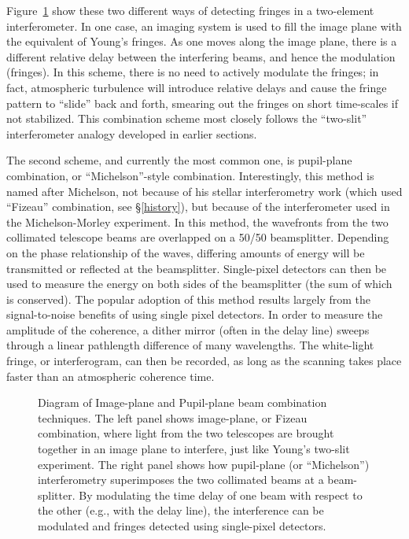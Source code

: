 \documentclass[12pt]{article}
\begin{document}
Figure~\ref{monnier_combiner} show these two different ways of
detecting fringes in a two-element interferometer.  In one case, an
imaging system is used to fill the image plane with the equivalent of
Young's fringes.  As one moves along the image plane, there is a
different relative delay between the interfering beams, and hence the
modulation (fringes).  In this scheme, there is no need to actively
modulate the fringes; in fact, atmospheric turbulence will introduce
relative delays and cause the fringe pattern to ``slide'' back and
forth, smearing out the fringes on short time-scales if not
stabilized.  This combination scheme most closely follows the
``two-slit'' interferometer analogy developed in earlier sections.

The second scheme, and currently the most common one, is pupil-plane
combination, or ``Michelson''-style combination.  Interestingly, this
method is named after Michelson, not because of his stellar
interferometry work (which used ``Fizeau'' combination, see
\S\ref{history}), but because of the interferometer used in the
Michelson-Morley experiment.  In this method, the wavefronts from the
two collimated telescope beams are overlapped on a 50/50 beamsplitter.
Depending on the phase relationship of the waves, differing amounts of
energy will be transmitted or reflected at the beamsplitter.
Single-pixel detectors can then be used to measure the energy on both
sides of the beamsplitter (the sum of which is conserved).  The
popular adoption of this method results largely from the
signal-to-noise benefits of using single pixel detectors.  In order to
measure the amplitude of the coherence, a dither mirror (often in the
delay line) sweeps through a linear pathlength difference of many
wavelengths. The white-light fringe, or interferogram, can then be
recorded, as long as the scanning takes place faster than an
atmospheric coherence time.


\begin{figure}
\begin{center}
\caption
{Diagram of Image-plane and Pupil-plane beam combination techniques.
  The left panel shows image-plane, or Fizeau combination, where light
  from the two telescopes are brought together in an image plane to
  interfere, just like Young's two-slit experiment.  The right panel
  shows how pupil-plane (or ``Michelson'') interferometry superimposes
  the two collimated beams at a beam-splitter.  By modulating the time
  delay of one beam with respect to the other (e.g., with the delay
  line), the interference can be modulated and fringes detected using
  single-pixel detectors. 
\label{monnier_combiner}}
\end{center}
\end{figure}
\end{document}
